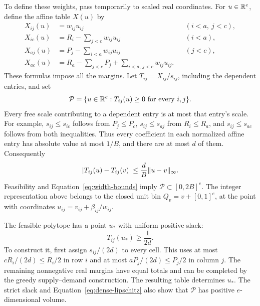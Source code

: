 To define these weights, pass temporarily to scaled real coordinates.
For $u\in\mathbb{R}^e$, define the affine table $X(u)$ by
\begin{align*}
 X_{ij}(u)&=w_{ij}u_{ij} &&(i<a,\ j<c),\\
 X_{ic}(u)&=R_i-\sum_{j<c}w_{ij}u_{ij} &&(i<a),\\
 X_{aj}(u)&=P_j-\sum_{i<a}w_{ij}u_{ij} &&(j<c),\\
 X_{ac}(u)&=R_a-\sum_{j<c}P_j+
                    \sum_{i<a,\,j<c}w_{ij}u_{ij}.
\end{align*}
These formulas impose all the margins.  Let $T_{ij}=X_{ij}/s_{ij}$,
including the dependent entries, and set
\[
 \mathcal P=\{u\in\mathbb{R}^e:T_{ij}(u)\ge0\text{ for every }i,j\}.
\]
Every free scale contributing to a dependent entry is at most that
entry's scale.  For example, $s_{ij}\le s_{ic}$ follows from
$P_j\le P_c$, $s_{ij}\le s_{aj}$ from $R_i\le R_a$, and
$s_{ij}\le s_{ac}$ follows from both inequalities.  Thus every coefficient
in each normalized affine entry has absolute value at most $1/B$, and
there are at most $d$ of them.  Consequently
\begin{equation}\label{eq:dense-lipschitz}
 |T_{ij}(u)-T_{ij}(v)|\le\frac dB\lVert u-v\rVert_\infty.
\end{equation}
Feasibility and Equation~\eqref{eq:width-bounds} imply
$\mathcal P\subset[0,2B]^e$.  The integer representation above belongs
to the closed unit bin $Q_v=v+[0,1]^e$, at the point with coordinates
$u_{ij}=v_{ij}+\beta_{ij}/w_{ij}$.

The feasible polytope has a point $u_*$ with uniform positive slack:
\begin{equation}\label{eq:dense-interior}
 T_{ij}(u_*)\ge\frac1{2d}.
\end{equation}
To construct it, first assign $s_{ij}/(2d)$ to every cell.  This uses at
most $cR_i/(2d)\le R_i/2$ in row $i$ and at most
$aP_j/(2d)\le P_j/2$ in column $j$.  The remaining nonnegative real
margins have equal totals and can be completed by the greedy
supply--demand construction.  The resulting table determines $u_*$.
The strict slack and Equation~\eqref{eq:dense-lipschitz} also show that
$\mathcal P$ has positive $e$-dimensional volume.

